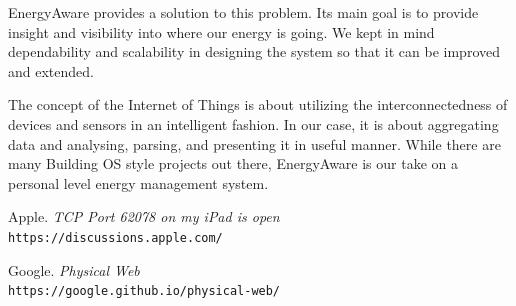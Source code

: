 \documentclass{sig-alternate-05-2015}
\begin{document}
EnergyAware provides a solution to this problem. Its main goal is to provide insight and visibility into where our energy is going. We kept in mind dependability and scalability in designing the system so that it can be improved and extended.

The concept of the Internet of Things is about utilizing the interconnectedness of devices and sensors in an intelligent fashion. In our case, it is about aggregating data and analysing, parsing, and presenting it in useful manner. While there are many Building OS style projects out there, EnergyAware is our take on a personal level energy management system.

\begin{thebibliography}{9}
	Apple. 
	\textit{TCP Port 62078 on my iPad is open}\\ 
	\texttt{https://discussions.apple.com/}
	
	Google.
	\textit{Physical Web}\\ 
	\texttt{https://google.github.io/physical-web/}
\end{thebibliography}
\end{document}
